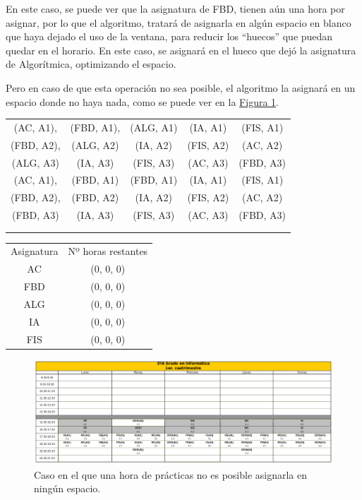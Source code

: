 En este caso, se puede ver que la asignatura de FBD, tienen aún una hora por asignar, por lo que el algoritmo, tratará de asignarla en algún espacio en blanco que haya dejado el uso de la ventana, para reducir los ``huecos'' que puedan quedar en el horario. En este caso, se asignará en el hueco que dejó la asignatura de Algorítmica, optimizando el espacio. 

Pero en caso de que esta operación no sea posible, el algoritmo la asignará en un espacio donde no haya nada, como se puede ver en la \hyperref[horario]{Figura \ref*{horario}}.

\begin{minipage}{0.8\textwidth}    
\begin{tabular}{| c | c | c | c | c |}
\hline
 (AC, A1), & (FBD, A1), & (ALG, A1) & (IA, A1) & (FIS, A1) \\
 (FBD, A2), & (ALG, A2) & (IA, A2) & (FIS, A2) & (AC, A2) \\
 (ALG, A3) &  (IA, A3) & (FIS, A3) & (AC, A3) & (FBD, A3) \\
 \hline
 (AC, A1), & (FBD, A1) & (FBD, A1) & (IA, A1) & (FIS, A1) \\
 (FBD, A2), & (FBD, A2) & (IA, A2) & (FIS, A2) & (AC, A2) \\
 (FBD, A3) & (IA, A3) & (FIS, A3) & (AC, A3) & (FBD, A3) \\
 \hline
 &  &  &  & \\
 \hline
 &  &  &  & \\
 \hline 
\end{tabular}
\end{minipage}
\begin{minipage}{1\textwidth}
\begin{tabular}{c | c}
Asignatura & Nº horas restantes \\
AC & (0, 0, 0) \\
FBD & (0, 0, 0) \\
ALG & (0, 0, 0) \\
IA & (0, 0, 0) \\
FIS & (0, 0, 0)
\end{tabular}
\end{minipage}

\begin{figure}[H]
    \centering
    \includegraphics[width=\textwidth]{img/horario}
    \caption{Caso en el que una hora de prácticas no es posible asignarla en ningún espacio.}
    \label{horario}
\end{figure}

